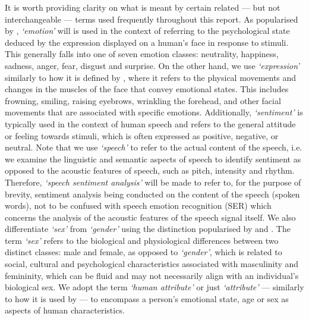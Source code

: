 \documentclass[12pt, a4paper]{article}
\newcommand{\np}
    {
    \vskip 0.4cm
    }
\begin{document}
It is worth providing clarity on what is meant by certain related --- but not interchangeable --- terms used frequently throughout this report. As popularised by \cite{dzedzickis2020human}, \textit{`emotion'} will is used in the context of referring to the psychological state deduced by the expression displayed on a human's face in response to stimuli. This generally falls into one of seven emotion classes: neutrality, happiness, sadness, anger, fear, disgust and surprise. On the other hand, we use \textit{`expression'} similarly to how it is defined by \cite{bettadapura2012face}, where it refers to the physical movements and changes in the muscles of the face that convey emotional states. This includes frowning, smiling, raising eyebrows, wrinkling the forehead, and other facial movements that are associated with specific emotions. Additionally, \textit{`sentiment'} is typically used in the context of human speech and refers to the general attitude or feeling towards stimuli, which is often expressed as positive, negative, or neutral. Note that we use \textit{`speech'} to refer to the actual content of the speech, i.e. we examine the linguistic and semantic aspects of speech to identify sentiment as opposed to the acoustic features of speech, such as pitch, intensity and rhythm. Therefore, \textit{`speech sentiment analysis'} will be made to refer to, for the purpose of brevity, sentiment analysis being conducted on the content of the speech (spoken words), not to be confused with speech emotion recognition (SER) which concerns the analysis of the acoustic features of the speech signal itself. We also differentiate \textit{`sex'} from \textit{`gender'} using the distinction popularised by \cite{prince2005sex} and \cite{deaux1985sex}. The term \textit{`sex'} refers to the biological and physiological differences between two distinct classes: male and female, as opposed to \textit{`gender'}, which is related to social, cultural and psychological characteristics associated with masculinity and femininity, which can be fluid and may not necessarily align with an individual's biological sex. We adopt the term \textit{`human attribute'} or just \textit{`attribute'} --- similarly to how it is used by \cite{yaghoubi2020human} --- to encompass a person's emotional state, age or sex as aspects of human characteristics.
\np
\end{document}

